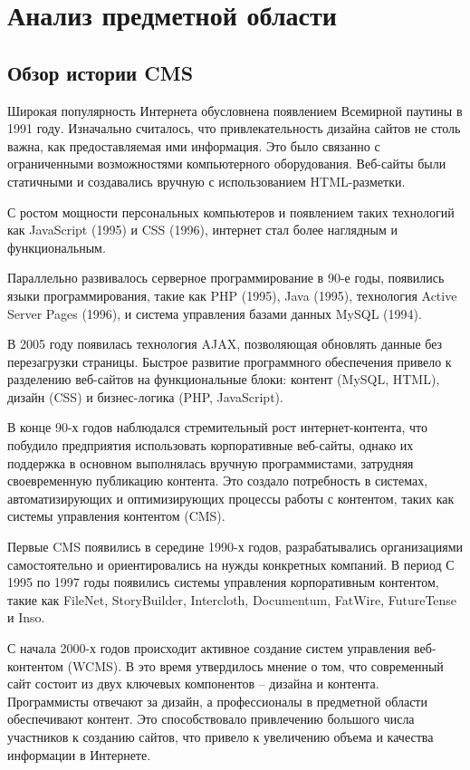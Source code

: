 \section{Анализ предметной области}
\subsection{Обзор истории CMS}
Широкая популярность Интернета обусловнена появлением Всемирной паутины в 1991 году. Изначально считалось, что привлекательность дизайна сайтов не столь важна, как предоставляемая ими информация. Это было связанно с ограниченными возможностями компьютерного оборудования. Веб-сайты были статичными и создавались вручную с использованием HTML-разметки.

С ростом мощности персональных компьютеров и появлением таких технологий как JavaScript (1995) и CSS (1996), интернет стал более наглядным и функциональным.

Параллельно развивалось серверное программирование в 90-е годы, появились языки программирования, такие как PHP (1995), Java (1995), технология Active Server Pages (1996), и система управления базами данных MySQL (1994).

В 2005 году появилась технология AJAX, позволяющая обновлять данные без перезагрузки страницы. Быстрое развитие программного обеспечения привело к разделению веб-сайтов на функциональные блоки: контент (MySQL, HTML), дизайн (CSS) и бизнес-логика (PHP, JavaScript).

В конце 90-х годов наблюдался стремительный рост интернет-контента, что побудило предприятия использовать корпоративные веб-сайты, однако их поддержка в основном выполнялась вручную программистами, затрудняя своевременную публикацию контента. Это создало потребность в системах, автоматизирующих и оптимизирующих процессы работы с контентом, таких как системы управления контентом (CMS).

Первые CMS появились в середине 1990-х годов, разрабатывались организациями самостоятельно и ориентировались на нужды конкретных компаний. В период С 1995 по 1997 годы появились системы управления корпоративным контентом, такие как FileNet, StoryBuilder, Intercloth, Documentum, FatWire, FutureTense и Inso.

С начала 2000-х годов происходит активное создание систем управления веб-контентом (WCMS). В это время утвердилось мнение о том, что современный сайт состоит из двух ключевых компонентов – дизайна и контента. Программисты отвечают за дизайн, а профессионалы в предметной области обеспечивают контент. Это способствовало привлечению большого числа участников к созданию сайтов, что привело к увеличению объема и качества информации в Интернете.

